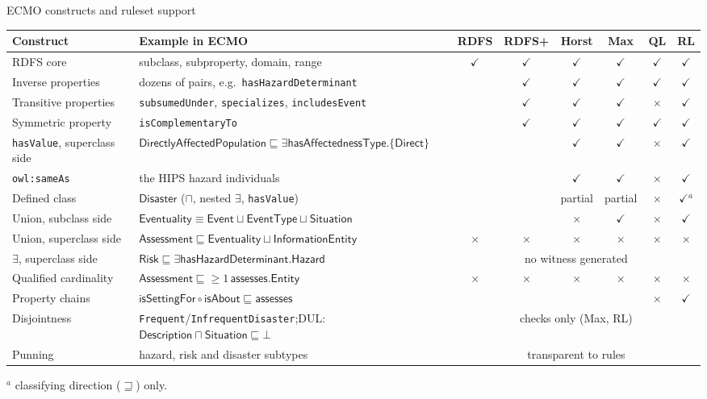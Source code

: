 \documentclass[10pt,aspectratio=169,xcolor=table]{beamer}
\newcommand{\cn}[1]{\mathsf{#1}}
\newcommand{\rn}[1]{\mathsf{#1}}
\newcommand{\ind}[1]{\mathsf{#1}}
\newcommand{\sub}{\sqsubseteq}
\newcommand{\eqv}{\equiv}
\newcommand{\tyes}{\textcolor{okgreen}{$\checkmark$}}
\newcommand{\tno}{\textcolor{nored}{$\times$}}
\begin{document}
\begin{frame}{ECMO constructs and ruleset support}
  \centering\scriptsize
  \setlength{\tabcolsep}{2.6pt}
  \renewcommand{\arraystretch}{0.95}
  \begin{tabular}{@{}p{3.0cm}p{6.3cm}cccccc@{}}
    \toprule
    \textbf{Construct} & \textbf{Example in ECMO} & \textbf{RDFS} & \textbf{RDFS+} &
      \textbf{Horst} & \textbf{Max} & \textbf{QL} & \textbf{RL}\\
    \midrule
    RDFS core & subclass, subproperty, domain, range
      & \tyes & \tyes & \tyes & \tyes & \tyes & \tyes\\
    Inverse properties & dozens of pairs, e.g.\ \texttt{hasHazardDeterminant}
      & & \tyes & \tyes & \tyes & \tyes & \tyes\\
    Transitive properties & \texttt{subsumedUnder}, \texttt{specializes}, \texttt{includesEvent}
      & & \tyes & \tyes & \tyes & \tno & \tyes\\
    Symmetric property & \texttt{isComplementaryTo}
      & & \tyes & \tyes & \tyes & \tyes & \tyes\\
    \texttt{hasValue}, superclass side
      & $\cn{DirectlyAffectedPopulation} \sub$\newline\hspace*{1em}$\exists\rn{hasAffectednessType}.\{\ind{Direct}\}$
      & & & \tyes & \tyes & \tno & \tyes\\
    \texttt{owl:sameAs} & the HIPS hazard individuals
      & & & \tyes & \tyes & \tno & \tyes\\
    Defined class & $\cn{Disaster}$ ($\sqcap$, nested $\exists$, \texttt{hasValue})
      & & & partial & partial & \tno & \tyes$^{a}$\\
    Union, subclass side & $\cn{Eventuality} \eqv \cn{Event} \sqcup \cn{EventType} \sqcup \cn{Situation}$
      & & & \tno & \tyes & \tno & \tyes\\
    Union, superclass side & $\cn{Assessment} \sub \cn{Eventuality} \sqcup \cn{InformationEntity}$
      & \tno & \tno & \tno & \tno & \tno & \tno\\
    $\exists$, superclass side & $\cn{Risk} \sub \exists\rn{hasHazardDeterminant}.\cn{Hazard}$
      & \multicolumn{6}{c}{no witness generated}\\
    Qualified cardinality & $\cn{Assessment} \sub {\geq}1\,\rn{assesses}.\cn{Entity}$
      & \tno & \tno & \tno & \tno & \tno & \tno\\
    Property chains & $\rn{isSettingFor} \circ \rn{isAbout} \sub \rn{assesses}$
      & & & & & \tno & \tyes\\
    Disjointness & \texttt{Frequent}/\texttt{InfrequentDisaster};\newline DUL: $\cn{Description} \sqcap \cn{Situation} \sub \bot$
      & \multicolumn{6}{c}{checks only (Max, RL)}\\
    Punning & hazard, risk and disaster subtypes
      & \multicolumn{6}{c}{transparent to rules}\\
    \bottomrule
  \end{tabular}

  \vspace{3pt}\raggedright\scriptsize $^{a}$ classifying direction ($\sqsupseteq$) only.
\end{frame}
\end{document}
